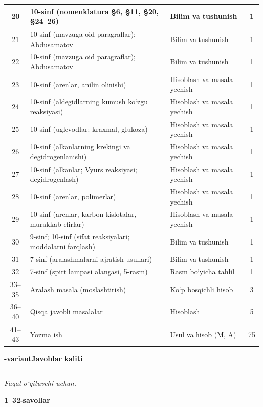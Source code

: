\documentclass[11pt,a4paper]{article}
\newcommand{\hdrpill}[1]{\begin{tikzpicture}[baseline=0pt]\node[fill=ygreen,text=white,rounded corners=8pt,inner xsep=10pt,inner ysep=5pt,font=\fontsize{13}{15}\bfseries\selectfont] at (0,0.475){#1};\end{tikzpicture}}
\newcommand{\curvar}{}\fancyhead[R]{\hdrpill{\curvar}}
\begin{document}
{\begin{longtable}{|c|p{7.2cm}|p{5.4cm}|c|}
20 & 10-sinf (nomenklatura \S{}6, \S{}11, \S{}20, \S{}24--26) & Bilim va tushunish & 1\\\hline
21 & 10-sinf (mavzuga oid paragraflar); Abdusamatov & Bilim va tushunish & 1\\\hline
22 & 10-sinf (mavzuga oid paragraflar); Abdusamatov & Bilim va tushunish & 1\\\hline
23 & 10-sinf (arenlar, anilin olinishi) & Hisoblash va masala yechish & 1\\\hline
24 & 10-sinf (aldegidlarning kumush ko`zgu reaksiyasi) & Hisoblash va masala yechish & 1\\\hline
25 & 10-sinf (uglevodlar: kraxmal, glukoza) & Hisoblash va masala yechish & 1\\\hline
26 & 10-sinf (alkanlarning krekingi va degidrogenlanishi) & Hisoblash va masala yechish & 1\\\hline
27 & 10-sinf (alkanlar; Vyurs reaksiyasi; degidrogenlash) & Hisoblash va masala yechish & 1\\\hline
28 & 10-sinf (arenlar, polimerlar) & Hisoblash va masala yechish & 1\\\hline
29 & 10-sinf (arenlar, karbon kislotalar, murakkab efirlar) & Hisoblash va masala yechish & 1\\\hline
30 & 9-sinf; 10-sinf (sifat reaksiyalari; moddalarni farqlash) & Bilim va tushunish & 1\\\hline
31 & 7-sinf (aralashmalarni ajratish usullari) & Bilim va tushunish & 1\\\hline
32 & 7-sinf (spirt lampasi alangasi, 5-rasm) & Rasm bo`yicha tahlil & 1\\\hline
33--35 & Aralash masala (moslashtirish) & Ko`p bosqichli hisob & 3\\\hline
36--40 & Qisqa javobli masalalar & Hisoblash & 5\\\hline
41--43 & Yozma ish & Usul va hisob (M, A) & 75\\\hline
\end{longtable}}
\renewcommand{\curvar}{Javoblar}
\newpage
\noindent\textbf{\fontsize{13}{15}-variant}\hfill \textbf{Javoblar kaliti}\par\smallskip\hrule\smallskip
\textit{Faqat o`qituvchi uchun.}\par\medskip
\noindent\textbf{1--32-savollar}\par\smallskip
\end{document}

